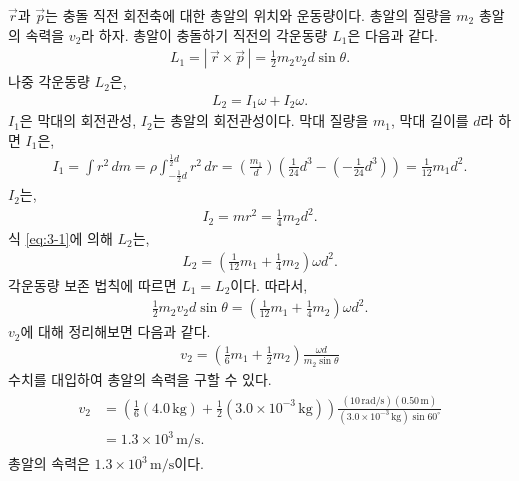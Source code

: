 \documentclass[floatfix,nofootinbib,superscriptaddress,fleqn]{revtex4-2}
\begin{document}
$\vec{r}$과 $\vec{p}$는 충돌 직전 회전축에 대한 총알의 위치와 운동량이다.
 총알의 질량을 $m_2$ 총알의 속력을 $v_2$라 하자.
총알이 충돌하기 직전의 각운동량 $L_1$은 다음과 같다.
\begin{align}
  L_1 =|\,\vec{r}\times\vec{p}\,|=\frac{1}{2} m_2v_2d\sin\theta.
\end{align}
나중 각운동량 $L_2$은,
\begin{align}\label{eq:3-1}
  L_2 = I_1\omega+ I_2\omega.
\end{align}
$I_1$은 막대의 회전관성, $I_2$는 총알의 회전관성이다.
막대 질량을 $m_1$, 막대 길이를 $d$라 하면 $I_1$은,
\begin{align}
  I_1 = \int r^2\,dm = \rho\int_{-\frac{1}{2}d} ^{\frac{1}{2}d}r^2\,dr
  =\left(\frac{m_1}{d}\right)\left(\frac{1}{24}d^3
  -\left(-\frac{1}{24}d^3\right)\right)
  =\frac{1}{12}m_1d^2.
\end{align}
$I_2$는,
\begin{align}
  I_2 =  mr^2 = \frac{1}{4}m_2d^2.
\end{align}
식 \eqref{eq:3-1}에 의해 $L_2$는,
\begin{align}
  L_2 = \left(\frac{1}{12}m_1+\frac{1}{4}m_2\right)\omega d^2.
\end{align}
각운동량 보존 법칙에 따르면 $L_1=L_2$이다. 따라서,
\begin{align}
  \frac{1}{2}m_2v_2d\sin\theta=\left(\frac{1}{12}m_1
  +\frac{1}{4}m_2\right)\omega d^2.
\end{align}
$v_2$에 대해 정리해보면 다음과 같다.
\begin{align}
  v_2 = \left(\frac{1}{6}m_1+\frac{1}{2}m_2\right)\frac{\omega d}{m_2\sin\theta}
\end{align}
수치를 대입하여 총알의 속력을 구할 수 있다.
\begin{align}
  \begin{split}
    v_2 &= \left(\frac{1}{6}(4.0\,\mathrm{kg})
    +\frac{1}{2}(3.0\times 10^{-3}\,\mathrm{kg})\right)
    \frac{(10\,\mathrm{rad/s}) (0.50\,\mathrm{m})}
    {(3.0\times 10^{-3}\,\mathrm{kg})\sin{60^\circ}}  \\
    &= 1.3\times 10^3\,\mathrm{m/s}.
  \end{split}
\end{align}
총알의 속력은 $1.3\times 10^3\,\mathrm{m/s}$이다.
\vspace{1.cm}
\end{document}
